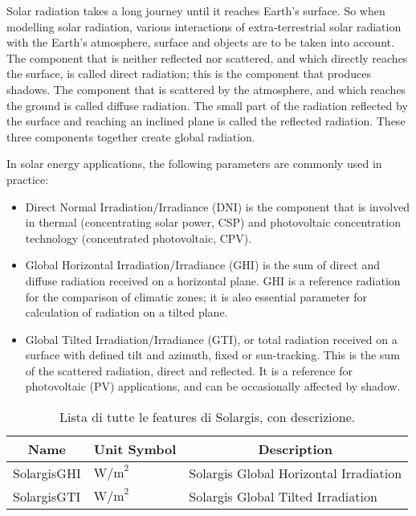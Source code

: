 
Solar radiation takes a long journey until it reaches Earth’s surface. So when
modelling solar radiation, various interactions of extra-terrestrial solar
radiation with the Earth’s atmosphere, surface and objects are to be taken into
account. The component that is neither reflected nor scattered, and which
directly
reaches the surface, is called direct radiation; this is the component that
produces shadows. The component that is scattered by the atmosphere, and which
reaches the ground is called diffuse radiation. The small part of the radiation
reflected by the surface and reaching an inclined plane is called the reflected
radiation. These three components together create global radiation.

In solar energy applications, the following parameters are commonly used in
practice:

\begin{itemize}
	\item Direct Normal Irradiation/Irradiance (DNI) is the component that is
	      involved in thermal (concentrating solar power, CSP) and photovoltaic
	      concentration
	      technology (concentrated photovoltaic, CPV).
	\item  Global Horizontal
	      Irradiation/Irradiance (GHI) is the sum of direct and diffuse radiation
	      received on a horizontal plane. GHI is a reference radiation for the
	      comparison of climatic zones; it is also essential parameter for
	      calculation of radiation on a tilted plane.
	\item Global Tilted Irradiation/Irradiance (GTI), or total
	      radiation received on a surface with defined tilt and azimuth, fixed or
	      sun-tracking. This is the sum of the scattered radiation, direct and
	      reflected. It is a reference for photovoltaic (PV) applications, and
	      can be occasionally affected by shadow.
\end{itemize}


\begin{table}[H]
	\begin{center}
		\begin{tabular}[c]{l|l|l}
			\hline
			\multicolumn{1}{c|}{\textbf{Name}}        &
			\multicolumn{1}{c|}{\textbf{Unit Symbol}} &
			\multicolumn{1}{c}{\textbf{Description}}                                                            \\
			\hline
			SolargisGHI                               & $\text{W/m}^2$ & Solargis Global Horizontal Irradiation \\
			SolargisGTI                               & $\text{W/m}^2$ & Solargis Global Tilted Irradiation     \\
			\hline
		\end{tabular}
		\caption{Lista di tutte le features di Solargis, con descrizione.}\label{tab:solargisfeatures}
	\end{center}
\end{table}

